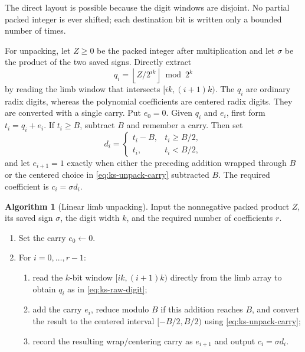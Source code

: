 \documentclass[11pt]{book}
\theoremstyle{definition}
\newtheorem{algorithm}[theorem]{Algorithm}
\begin{document}
The direct layout is possible because the digit windows are disjoint.  No
partial packed integer is ever shifted; each destination bit is written only a
bounded number of times.

For unpacking, let $Z\geq0$ be the packed integer after multiplication and let
$\sigma$ be the product of the two saved signs.  Directly extract
\begin{equation}\label{eq:ks-raw-digit}
 q_i=\left\lfloor Z/2^{ik}\right\rfloor\bmod 2^k
\end{equation}
by reading the limb window that intersects $[ik,(i+1)k)$.  The $q_i$ are
ordinary radix digits, whereas the polynomial coefficients are centered
radix digits.  They are converted with a single carry.  Put $e_0=0$.  Given
$q_i$ and $e_i$, first form $t_i=q_i+e_i$.  If $t_i\geq B$, subtract $B$ and
remember a carry.  Then set
\begin{equation}\label{eq:ks-unpack-carry}
 d_i=\begin{cases}
       t_i-B,&t_i\geq B/2,\\
       t_i,&t_i<B/2,
     \end{cases}
\end{equation}
and let $e_{i+1}=1$ exactly when either the preceding addition wrapped through
$B$ or the centered choice in \eqref{eq:ks-unpack-carry} subtracted $B$.
The required coefficient is $c_i=\sigma d_i$.

\begin{algorithm}[Linear limb unpacking]\label{alg:ks-linear-unpack}
Input the nonnegative packed product $Z$, its saved sign $\sigma$, the digit
width $k$, and the required number of coefficients $r$.
\begin{enumerate}
 \item Set the carry $e_0\leftarrow0$.
 \item For $i=0,\ldots,r-1$:
 \begin{enumerate}
  \item read the $k$-bit window $[ik,(i+1)k)$ directly from the limb array to
        obtain $q_i$ as in \eqref{eq:ks-raw-digit};
  \item add the carry $e_i$, reduce modulo $B$ if this addition reaches $B$,
        and convert the result to the centered interval $[-B/2,B/2)$ using
        \eqref{eq:ks-unpack-carry};
  \item record the resulting wrap/centering carry as $e_{i+1}$ and output
        $c_i=\sigma d_i$.
 \end{enumerate}
\end{enumerate}
\end{algorithm}
\end{document}
